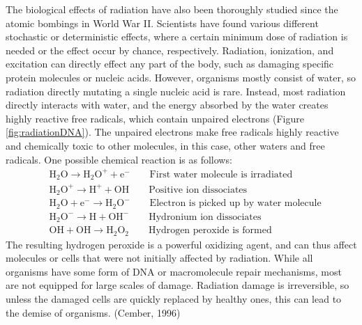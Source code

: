 \documentclass[12pt,twoside]{reedthesis}
\begin{document}
The biological effects of radiation have also been thoroughly studied since the atomic bombings in World War II. Scientists have found various different stochastic or deterministic effects, where a certain minimum dose of radiation is needed or the effect occur by chance, respectively. Radiation, ionization, and excitation can directly effect any part of the body, such as damaging specific protein molecules or nucleic acids. However, organisms mostly consist of water, so radiation directly mutating a single nucleic acid is rare. Instead, most radiation directly interacts with water, and the energy absorbed by the water creates highly reactive free radicals, which contain unpaired electrons (Figure \ref{fig:radiationDNA}). The unpaired electrons make free radicals highly reactive and chemically toxic to other molecules, in this case, other waters and free radicals. One possible chemical reaction is as follows:
\begin{align*}
  &\mathrm{H_{2}O} \longrightarrow \mathrm{H_{2}O^{+} + e^-}   \qquad \text{First water molecule is irradiated} \\
  &\mathrm{H_{2}O^+} \longrightarrow \mathrm{H^{+} + OH}       \qquad \text{Positive ion dissociates} \\
  &\mathrm{H_{2}O + e^-} \longrightarrow \mathrm{H_{2}O^-}     \qquad \text{Electron is picked up by water molecule} \\
  &\mathrm{H_{2}O^-} \longrightarrow \mathrm{H + OH^-}         \qquad \text{Hydronium ion dissociates} \\
  &\mathrm{OH + OH} \longrightarrow \mathrm{H_{2}O_{2}}        \qquad \text{Hydrogen peroxide is formed} 
  \label{eq:reaction}
\end{align*}
The resulting hydrogen peroxide is a powerful oxidizing agent, and can thus affect molecules or cells that were not initially affected by radiation. While all organisms have some form of DNA or macromolecule repair mechanisms, most are not equipped for large scales of damage. Radiation damage is irreversible, so unless the damaged cells are quickly replaced by healthy ones, this can lead to the demise of organisms. (Cember, 1996)
\end{document}
